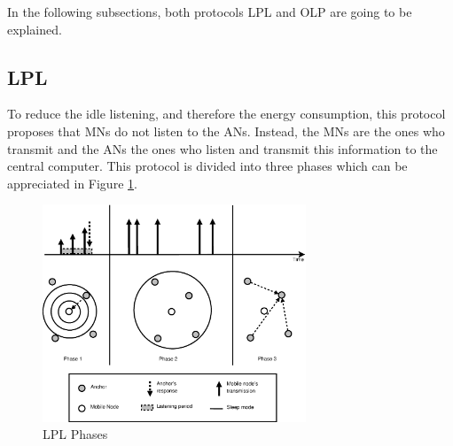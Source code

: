In the following subsections, both protocols \ac{LPL} and \ac {OLP} are going to be explained.

\subsection{\acl{LPL}}

To reduce the idle listening, and therefore the energy consumption, this protocol proposes that \acp{MN} do not listen to the \acp{AN}. Instead, the
\acp{MN} are the ones who transmit and the \acp{AN} the ones who listen and transmit this information to the central computer. This protocol is 
divided into three phases which can be appreciated in Figure \ref{fig:LPL}.

\begin{figure}[ht]
 \begin{center}
  \includegraphics[width=0.7\textwidth]{LPL.eps}
 \end{center}
 \caption{LPL Phases \cite{LPLandOLP}}
 \label{fig:LPL}
\end{figure}

